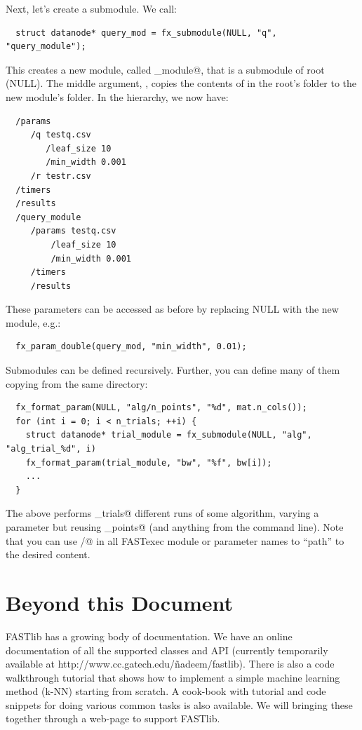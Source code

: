 \documentclass[letter]{report}
\begin{document}
Next, let's create a submodule.  We call:
\begin{verbatim}
  struct datanode* query_mod = fx_submodule(NULL, "q", "query_module");
\end{verbatim}
This creates a new module, called \verb@query_module@, that is a
submodule of root (NULL).  The middle argument, \verb@q@, copies the
contents of \verb@q@ in the root's \verb@params@ folder to the new
module's \verb@params@ folder.  In the hierarchy, we now have:
\begin{verbatim}
  /params
     /q testq.csv
        /leaf_size 10
        /min_width 0.001
     /r testr.csv
  /timers
  /results
  /query_module
     /params testq.csv
         /leaf_size 10
         /min_width 0.001
     /timers
     /results
\end{verbatim}
These parameters can be accessed as before by replacing NULL with the
new module, e.g.:
\begin{verbatim}
  fx_param_double(query_mod, "min_width", 0.01);
\end{verbatim}

Submodules can be defined recursively.  Further, you can define many
of them copying from the same directory:
\begin{verbatim}
  fx_format_param(NULL, "alg/n_points", "%d", mat.n_cols());
  for (int i = 0; i < n_trials; ++i) {
    struct datanode* trial_module = fx_submodule(NULL, "alg", "alg_trial_%d", i)
    fx_format_param(trial_module, "bw", "%f", bw[i]);
    ...
  }
\end{verbatim}
The above performs \verb@n_trials@ different runs of some algorithm,
varying a parameter \verb@bw@ but reusing \verb@n_points@ (and
anything from the command line).  Note that you can use \verb@/@ in
all FASTexec module or parameter names to ``path'' to the desired
content.

\chapter {Beyond this Document} 

FASTlib has a growing body of documentation. We have an online documentation of all the supported classes and API (currently temporarily available at http://www.cc.gatech.edu/\~nadeem/fastlib). There is also a code walkthrough tutorial that shows how to implement a simple machine learning method (k-NN) starting from scratch. A cook-book with tutorial and code snippets for doing various common tasks is also available. We will bringing these together through a web-page to support FASTlib.



\end{document}

